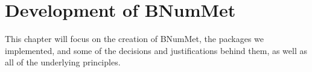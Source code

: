 \chapter{Development of BNumMet}
This chapter will focus on the creation of BNumMet, the packages we implemented, and some of the decisions and justifications behind them, as well as all of the underlying principles.




